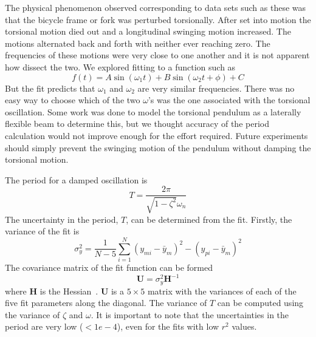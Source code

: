 \documentclass{bmd2010p}
\begin{document}
The physical phenomenon observed corresponding to data sets such as these was that
the bicycle frame or fork was perturbed torsionally. After set into motion the
torsional motion died out and a longitudinal swinging motion increased. The
motions alternated back and forth with neither ever reaching zero. The
frequencies of these motions were very close to one another and it is not
apparent how dissect the two. We explored fitting to a function such as
\begin{equation}
    f(t) = A\sin{(\omega_1 t)} + B\sin{(\omega_2 t + \phi)} + C
    \label{eqn:sumSines}
\end{equation}
But the fit predicts that $\omega_1$ and $\omega_2$ are very similar
frequencies. There was no easy way to choose which of the two $\omega$'s was
the one associated with the torsional oscillation. Some work was done to model
the torsional pendulum as a laterally flexible beam to determine this, but we
thought accuracy of the period calculation would not
improve enough for the effort required. Future experiments should simply
prevent the swinging motion of the pendulum without damping the torsional
motion.

The period for a damped oscillation is
\begin{equation}
    T = \frac{2\pi}{\sqrt{1-\zeta^2}\omega_n}
    \label{eqn:periodDamped}
\end{equation}
The uncertainty in the period, $T$, can be determined from the fit. Firstly,
the variance of the fit is
\begin{equation}
    \sigma_y^2 =
    \frac{1}{N-5}\sum_{i=1}^N(y_{mi}-\bar{y}_m)^2-(y_{pi}-\bar{y}_m)^2
    \label{eqn:fitVariance}
\end{equation}
The covariance matrix of the fit function can be formed
\begin{equation}
    \mathbf{U} = \sigma_y^2\mathbf{H}^{-1}
    \label{eqn:covariance}
\end{equation}
where $\mathbf{H}$ is the Hessian~\cite{Hubbard1989b}. $\mathbf{U}$ is a $5\times5$ matrix with the
variances of each of the five fit parameters along the diagonal.
The variance of $T$ can be computed using the variance of $\zeta$ and $\omega$. It
is important to note that the uncertainties in the period are very low
($<1e-4$), even for the fits with low $r^2$ values.
\end{document}
